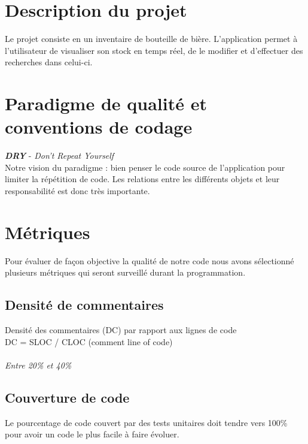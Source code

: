 \documentclass[10pt,a4paper]{article}
\begin{document}
\section{Description du projet}
Le projet consiste en un inventaire de bouteille de bière. L'application permet à l'utilisateur de visualiser son stock en temps réel, de le modifier et d'effectuer des recherches dans celui-ci. 

\section{Paradigme de qualité et conventions de codage}
\textbf{\textit{DRY}} - \textit{Don't Repeat Yourself}\\

Notre vision du paradigme : bien penser le code source de l'application pour limiter la répétition de code. Les relations entre les différents objets et leur responsabilité est donc très importante. 


\section{Métriques}
Pour évaluer de façon objective la qualité de notre code nous avons sélectionné plusieurs métriques qui seront surveillé durant la programmation. 

\subsection{Densité de commentaires}
Densité des commentaires (DC) par rapport aux lignes de code\\
DC = SLOC / CLOC (comment line of code)\\ \\

\textit{Entre 20\% et 40\%} 

\subsection{Couverture de code}
Le pourcentage de code couvert par des tests unitaires doit tendre vers 100\% pour avoir un code le plus facile à faire évoluer. 
\end{document}
